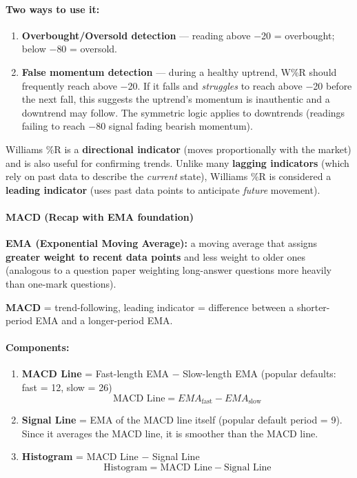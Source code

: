 \documentclass[12pt,openany]{book}
\begin{document}
\paragraph{Two ways to use it:}
\begin{enumerate}[leftmargin=*]
    \item \textbf{Overbought/Oversold detection} --- reading above \(-\)20 = overbought; below \(-\)80 = oversold.
    \item \textbf{False momentum detection} --- during a healthy uptrend, W\%R should frequently reach above \(-\)20. If it falls and \emph{struggles} to reach above \(-\)20 before the next fall, this suggests the uptrend's momentum is inauthentic and a downtrend may follow. The symmetric logic applies to downtrends (readings failing to reach \(-\)80 signal fading bearish momentum).
\end{enumerate}

Williams \%R is a \textbf{directional indicator} (moves proportionally with the market) and is also useful for confirming trends. Unlike many \textbf{lagging indicators} (which rely on past data to describe the \emph{current} state), Williams \%R is considered a \textbf{leading indicator} (uses past data points to anticipate \emph{future} movement).

\paragraph{MACD (Recap with EMA foundation)}

\textbf{EMA (Exponential Moving Average):} a moving average that assigns \textbf{greater weight to recent data points} and less weight to older ones (analogous to a question paper weighting long-answer questions more heavily than one-mark questions).

\textbf{MACD} = trend-following, leading indicator = difference between a shorter-period EMA and a longer-period EMA.

\paragraph{Components:}

\begin{enumerate}[leftmargin=*]
    \item \textbf{MACD Line} = Fast-length EMA \(-\) Slow-length EMA (popular defaults: fast = 12, slow = 26)
\[
\text{MACD Line} = EMA_{\text{fast}} - EMA_{\text{slow}}
\]
    \item \textbf{Signal Line} = EMA of the MACD line itself (popular default period = 9). Since it averages the MACD line, it is smoother than the MACD line.
    \item \textbf{Histogram} = MACD Line \(-\) Signal Line
\[
\text{Histogram} = \text{MACD Line} - \text{Signal Line}
\]
\end{enumerate}
\end{document}
